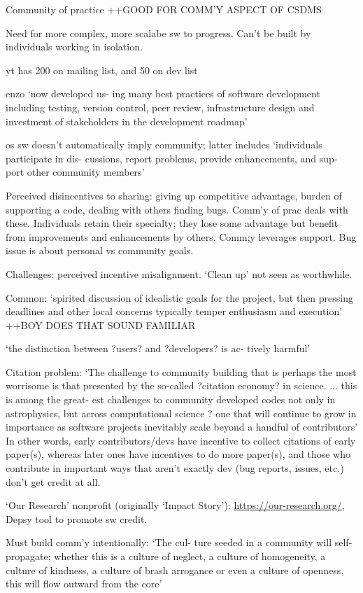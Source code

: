 \documentclass[12pt]{amsart}
\begin{document}
Community of practice ++GOOD FOR COMM'Y ASPECT OF CSDMS

Need for more complex, more scalabe sw to progress. Can't be built by individuals working in isolation.

yt has 200 on mailing list, and 50 on dev list

enzo `now developed us- ing many best practices of software development including testing, version control, peer review, infrastructure design and investment of stakeholders in the development roadmap'

os sw doesn't automatically imply community; latter includes `individuals participate in dis- cussions, report problems, provide enhancements, and sup- port other community members'

Perceived disincentives to sharing: giving up competitive advantage, burden of supporting a code, dealing with others finding bugs. Comm'y of prac deals with these. Individuals retain their specialty; they lose some advantage but benefit from improvements and enhancements by others. Comm;y leverages support. Bug issue is about personal vs community goals.

Challenges: perceived incentive misalignment. `Clean up' not seen as worthwhile. 

Common: `spirited discussion of idealistic goals for the project, but then pressing deadlines and other local concerns typically temper enthusiasm and execution' ++BOY DOES THAT SOUND FAMILIAR

`the distinction between ?users? and ?developers? is ac- tively harmful'

Citation problem: `The challenge to community building that is perhaps the most worrisome is that presented by the so-called ?citation economy? in science. ... this is among the great- est challenges to community developed codes not only in astrophysics, but across computational science ? one that will continue to grow in importance as software projects inevitably scale beyond a handful of contributors' In other words, early contributors/devs have incentive to collect citations of early paper(s), whereas later ones have incentives to do more paper(s), and those who contribute in important ways that aren't exactly dev (bug reports, issues, etc.) don't get credit at all.

`Our Research' nonprofit (originally `Impact Story'): \url{https://our-research.org/}, Depsy tool to promote sw credit.

Must build comm'y intentionally: `The cul- ture seeded in a community will self-propagate; whether this is a culture of neglect, a culture of homogeneity, a culture of kindness, a culture of brash arrogance or even a culture of openness, this will flow outward from the core'
\end{document}
